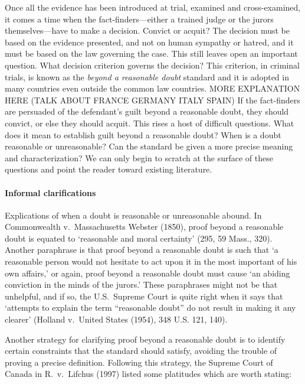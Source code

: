 \documentclass[10pt]{article}
\begin{document}
Once all the evidence has been introduced at trial, examined and cross-examined, it comes a time when the fact-finders---either a trained judge or the jurors themselves---have 
to make a decision. Convict or acquit? The decision must be based on the evidence presented, and not on human sympathy or hatred, and it must be based 
on the law governing the case. This still leaves open an important question. What decision criterion governs the decision? This criterion, in criminal trials, is known as the \textit{beyond a reasonable doubt} standard and it is adopted in many countries even outside the common law countries. MORE EXPLANATION HERE (TALK ABOUT FRANCE GERMANY ITALY SPAIN) 
If the fact-finders are persuaded of the defendant's guilt beyond a reasonable doubt, they should convict, or else they should acquit. This rises a host of difficult questions. What does  it mean to establish guilt beyond a reasonable doubt? When is a doubt reasonable or unreasonable? Can the standard be given a more precise meaning and characterization? We can only begin to scratch at the surface of these questions and point the reader toward existing literature. 
  
  \paragraph{Informal clarifications}
  Explications of when a doubt is reasonable or unreasonable abound. In Commonwealth v.\ Massachusetts Webster (1850), 
proof beyond a reasonable doubt is equated to `reasonable and moral certainty' (295, 59 Mass., 320).  Another paraphrase is that proof beyond a reasonable doubt is such that `a reasonable person would not hesitate to act upon it in the most important of his own affairs,' or again, proof beyond a reasonable doubt must cause `an abiding conviction in the minds of the jurors.' These paraphrases might not be that unhelpful, and if so, the U.S.\ Supreme Court is quite right when it says that `attempts to explain the term ``reasonable doubt'' do not result in making it any clearer' (Holland v.\ United States (1954), 348 U.S. 121, 140). 


Another strategy for clarifying proof beyond a reasonable doubt is to identify 
certain constraints that the standard should satisfy, avoiding the trouble 
of proving a precise definition. Following this strategy, the Supreme Court of Canada in R.\ v.\ Lifchus (1997) 
listed some platitudes which are worth stating:
\end{document}
